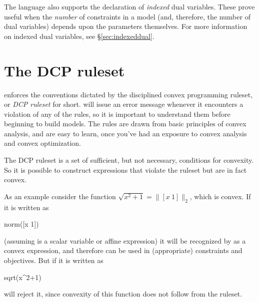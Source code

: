 \documentclass[12pt]{article}
\begin{document}
The \cvx language also supports the declaration of \emph{indexed} dual
variables. These prove useful when the \emph{number} of constraints in
a model (and, therefore, the number of dual variables) depends upon the
parameters themselves. For more information on indexed dual variables,
see \S\ref{sec:indexeddual}.

\section{The DCP ruleset}
\label{sec:rules}

\cvx enforces the conventions dictated by the
disciplined convex programming ruleset, or \emph{DCP ruleset} for short.
\cvx will issue an error message whenever it encounters a violation 
of any of the rules, so it is important to understand
them before beginning to build models. 
The rules are drawn from basic principles of convex analysis, and 
are easy to learn, once you've had an exposure to convex analysis
and convex optimization.

The DCP ruleset is a set of sufficient, but not necessary, conditions
for convexity.  So it is possible to construct expressions that violate
the ruleset but are in fact convex. 

As an example consider the function $\sqrt{x^2+1}=\|[x~1]\|_2$,
which is convex.
If it is written as
\begin{code}
	norm([x 1])
\end{code}
(assuming \verb@x@ is a scalar variable or affine expression)
it will be recognized by \cvx as a convex expression, and therefore 
can be used in (appropriate) constraints and objectives.
But if it is written as
\begin{code}
	sqrt(x^2+1)
\end{code}
\cvx will reject it, since convexity of this function does not follow
from the \cvx ruleset.
\end{document}
